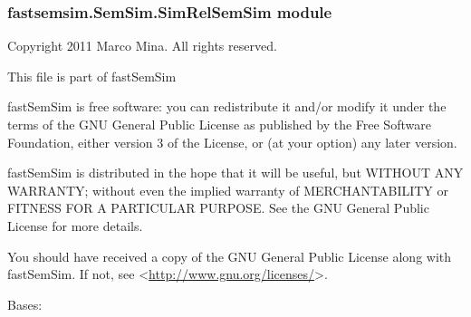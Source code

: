 \documentclass[letterpaper,10pt,english]{sphinxmanual}
\begin{document}
\subsubsection{fastsemsim.SemSim.SimRelSemSim module}
\label{fastsemsim.SemSim:fastsemsim-semsim-simrelsemsim-module}\label{fastsemsim.SemSim:module-fastsemsim.SemSim.SimRelSemSim}
Copyright 2011 Marco Mina. All rights reserved.

This file is part of fastSemSim

fastSemSim is free software: you can redistribute it and/or modify
it under the terms of the GNU General Public License as published by
the Free Software Foundation, either version 3 of the License, or
(at your option) any later version.

fastSemSim is distributed in the hope that it will be useful,
but WITHOUT ANY WARRANTY; without even the implied warranty of
MERCHANTABILITY or FITNESS FOR A PARTICULAR PURPOSE.  See the
GNU General Public License for more details.

You should have received a copy of the GNU General Public License
along with fastSemSim.  If not, see \textless{}\href{http://www.gnu.org/licenses/}{http://www.gnu.org/licenses/}\textgreater{}.

\begin{fulllineitems}
\label{fastsemsim.SemSim:fastsemsim.SemSim.SimRelSemSim.SimRelSemSim}
Bases: {\hyperref[fastsemsim.SemSim:fastsemsim.SemSim.TermSemSim.TermSemSim]{}}

\begin{fulllineitems}
\label{fastsemsim.SemSim:fastsemsim.SemSim.SimRelSemSim.SimRelSemSim.IC_based}
\end{fulllineitems}


\begin{fulllineitems}
\label{fastsemsim.SemSim:fastsemsim.SemSim.SimRelSemSim.SimRelSemSim.SS_type}
\end{fulllineitems}


\begin{fulllineitems}
\label{fastsemsim.SemSim:fastsemsim.SemSim.SimRelSemSim.SimRelSemSim.use_Lin}
\end{fulllineitems}


\end{fulllineitems}
\end{document}
